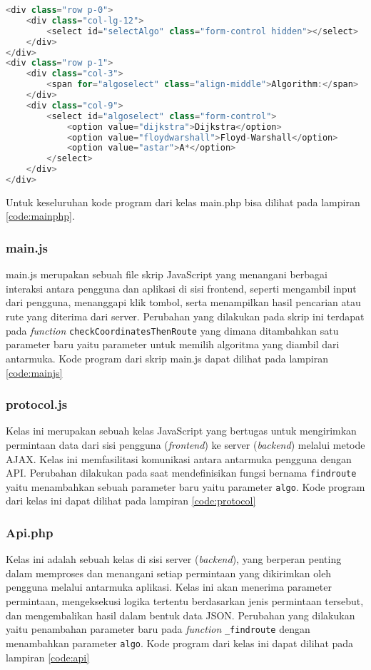 \begin{lstlisting}[language=Java, caption=main.php, basicstyle=\small\ttfamily]
<div class="row p-0">
	<div class="col-lg-12">
		<select id="selectAlgo" class="form-control hidden"></select>
	</div>
</div>
<div class="row p-1">
	<div class="col-3">
		<span for="algoselect" class="align-middle">Algorithm:</span>
	</div>
	<div class="col-9">
		<select id="algoselect" class="form-control">
			<option value="dijkstra">Dijkstra</option>
			<option value="floydwarshall">Floyd-Warshall</option>
			<option value="astar">A*</option>
		</select>
	</div>
</div>
\end{lstlisting}
\noindent
Untuk keseluruhan kode program dari kelas main.php bisa dilihat pada lampiran \ref{code:mainphp}.
\subsubsection{main.js}
main.js merupakan sebuah file skrip JavaScript yang menangani berbagai interaksi antara pengguna dan aplikasi di sisi frontend, seperti mengambil input dari pengguna, menanggapi klik tombol, serta menampilkan hasil pencarian atau rute yang diterima dari server. Perubahan yang dilakukan pada skrip ini terdapat pada \textit{function} \texttt{checkCoordinatesThenRoute} yang dimana ditambahkan satu parameter baru yaitu parameter untuk memilih algoritma yang diambil dari antarmuka. Kode program dari skrip main.js dapat dilihat pada lampiran \ref{code:mainjs}

\subsubsection{protocol.js}
Kelas ini merupakan sebuah kelas JavaScript yang bertugas untuk mengirimkan permintaan data dari sisi pengguna (\textit{frontend}) ke server (\textit{backend}) melalui metode AJAX. Kelas ini memfasilitasi komunikasi antara antarmuka pengguna dengan API. Perubahan dilakukan pada saat mendefinisikan fungsi bernama \texttt{findroute} yaitu menambahkan sebuah parameter baru yaitu parameter \texttt{algo}. Kode program dari kelas ini dapat dilihat pada lampiran \ref{code:protocol}

\subsubsection{Api.php}
Kelas ini adalah sebuah kelas di sisi server (\textit{backend}), yang berperan penting dalam memproses dan menangani setiap permintaan yang dikirimkan oleh pengguna melalui antarmuka aplikasi. Kelas ini akan menerima parameter permintaan, mengeksekusi logika tertentu berdasarkan jenis permintaan tersebut, dan mengembalikan hasil dalam bentuk data JSON. Perubahan yang dilakukan yaitu penambahan parameter baru pada \textit{function} \texttt{\_findroute} dengan menambahkan parameter \texttt{algo}. Kode program dari kelas ini dapat dilihat pada lampiran \ref{code:api}

